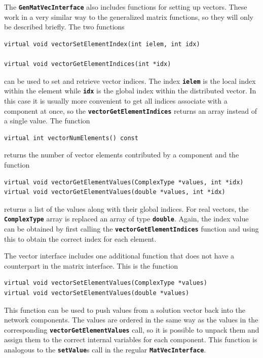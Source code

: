 The \texttt{\textbf{GenMatVecInterface}} also includes functions for setting up vectors. These work in a very similar way to the generalized matrix functions, so they will only be described briefly. The two functions

{
\color{red}
\begin{Verbatim}[fontseries=b]
virtual void vectorSetElementIndex(int ielem, int idx)

virtual void vectorGetElementIndices(int *idx)
\end{Verbatim}
}

can be used to set and retrieve vector indices. The index \texttt{\textbf{ielem}} is the local index within the element while \texttt{\textbf{idx}} is the global index within the distributed vector. In this case it is usually more convenient to get all indices associate with a component at once, so the \texttt{\textbf{vectorGetElementIndices}} returns an array instead of a single value. The function

{
\color{red}
\begin{Verbatim}[fontseries=b]
virtual int vectorNumElements() const
\end{Verbatim}
}

returns the number of vector elements contributed by a component and the function

{
\color{red}
\begin{Verbatim}[fontseries=b]
virtual void vectorGetElementValues(ComplexType *values, int *idx)
virtual void vectorGetElementValues(double *values, int *idx)
\end{Verbatim}
}

returns a list of the values along with their global indices. For real vectors, the \texttt{\textbf{ComplexType}} array is replaced an array of type \texttt{\textbf{double}}. Again, the index value can be obtained by first calling the \texttt{\textbf{vectorGetElementIndices}} function and using this to obtain the correct index for each element.

The vector interface includes one additional function that does not have a counterpart in the matrix interface. This is the function

{
\color{red}
\begin{Verbatim}[fontseries=b]
virtual void vectorSetElementValues(ComplexType *values)
virtual void vectorSetElementValues(double *values)
\end{Verbatim}
}

This function can be used to push values from a solution vector back into the network components. The values are ordered in the same way as the values in the corresponding \texttt{\textbf{vectorGetElementValues}} call, so it is possible to unpack them and assign them to the correct internal variables for each component. This function is analogous to the \texttt{\textbf{setValue}}s call in the regular \texttt{\textbf{MatVecInterface}}.

